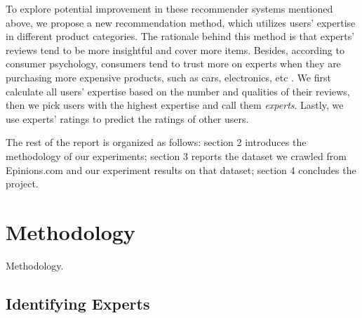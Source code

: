 \documentclass[12pt]{article}
\begin{document}
To explore potential improvement in these recommender systems mentioned above, we propose a new recommendation method, which utilizes users' expertise in different product categories. The rationale behind this method is that experts' reviews tend to be more insightful and cover more items. Besides, according to consumer psychology, consumers tend to trust more on experts when they are purchasing more expensive products, such as cars, electronics, etc \cite{consumer}. We first calculate all users' expertise based on the number and qualities of their reviews, then we pick users with the highest expertise and call them \emph{experts}. Lastly, we use experts' ratings to predict the ratings of other users. 

The rest of the report is organized as follows: section 2 introduces the methodology of our experiments; section 3 reports the dataset we crawled from Epinions.com and our experiment results on that dataset; section 4 concludes the project. 

\section{Methodology}
Methodology.

\subsection{Identifying Experts} %
\label{sub:identifying_experts}
\end{document}
